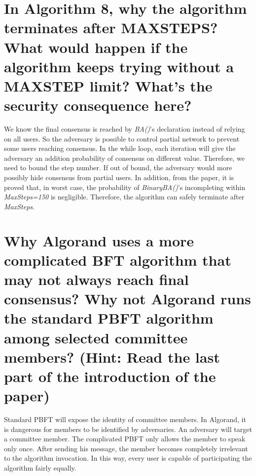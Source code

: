 \documentclass{article}
\begin{document}
\section{In Algorithm 8, why the algorithm terminates after MAXSTEPS? What would
happen if the algorithm keeps trying without a MAXSTEP limit? What’s the
security consequence here?}
We know the final consensus is reached by \textit{BA()}'s declaration instead of relying on 
all users.
So the adversary is possible to control partial network 
to prevent some users reaching consensus.
In the while loop, each iteration will give the adversary an addition probability
of consensus on different value. Therefore, we need to bound the step number.
If out of bound, the adversary would more possibly hide consensus from partial users.
In addition, from the paper, it is proved that, in worst case, 
the probability of \textit{BinaryBA()}'s 
incompleting within \textit{MaxSteps=150} is negligible. 
Therefore, the algorithm can safely terminate after \textit{MaxSteps}.
\section{Why Algorand uses a more complicated BFT algorithm that may not always reach
final consensus? Why not Algorand runs the standard PBFT algorithm among
selected committee members? (Hint: Read the last part of the introduction of the
paper)}
Standard PBFT will expose the identity of committee members.
In Algorand, it is dangerous for members to be identified by adversaries.
An adversary will target a committee member. The complicated PBFT 
only allows the member to speak only once. After sending his message,
the member becomes completely irrelevant to the algorithm invocation.
In this way, every user is capable of participating the algorithm 
fairly equally.
\end{document}
